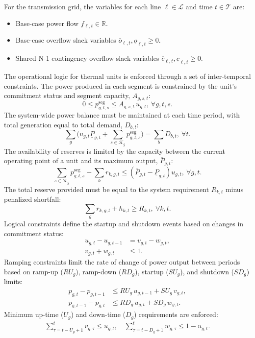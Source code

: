 \documentclass{ieeeaccess}
\begin{document}
For the transmission grid, the variables for each line $\ell\in\mathcal{L}$ and time $t\in\mathcal{T}$ are:
\begin{itemize}
    \item Base-case power flow $f_{\ell,t}\in\mathbb{R}$.
    \item Base-case overflow slack variables $\overline{o}_{\ell,t},\underline{o}_{\ell,t}\ge 0$.
    \item Shared N-1 contingency overflow slack variables $\overline{c}_{\ell,t},\underline{c}_{\ell,t}\ge 0$.
\end{itemize}

The operational logic for thermal units is enforced through a set of inter-temporal constraints. The power produced in each segment is constrained by the unit's commitment status and segment capacity, $A_{g,s,t}$:
\begin{equation}
0\le p^{\mathrm{seg}}_{g,t,s} \le A_{g,s,t}\,u_{g,t}, \ \forall g,t,s. \label{eq:seg-link}
\end{equation}
The system-wide power balance must be maintained at each time period, with total generation equal to total demand, $D_{b,t}$:
\begin{equation}
\sum_{g}\Big(u_{g,t}\underline{P}_{g,t}+\sum_{s\in \mathcal{K}_g}p^{\mathrm{seg}}_{g,t,s}\Big)=\sum_{b}D_{b,t}, \ \forall t. \label{eq:balance}
\end{equation}
The availability of reserves is limited by the capacity between the current operating point of a unit and its maximum output, $\overline{P}_{g,t}$:
\begin{equation}
\sum_{s\in \mathcal{K}_g}p^{\mathrm{seg}}_{g,t,s}+\sum_{k}r_{k,g,t}\le (\overline{P}_{g,t}-\underline{P}_{g,t})u_{g,t}, \ \forall g,t. \label{eq:res-head}
\end{equation}
The total reserve provided must be equal to the system requirement $R_{k,t}$ minus penalized shortfall:
\begin{equation}
\sum_{g}r_{k,g,t} + h_{k,t} \ge R_{k,t}, \ \forall k,t. \label{eq:res-req}
\end{equation}
Logical constraints define the startup and shutdown events based on changes in commitment status:
\begin{align}
u_{g,t}-u_{g,t-1} &= v_{g,t}-w_{g,t}, \label{eq:su-def}\\
v_{g,t}+w_{g,t} &\le 1. \label{eq:su-excl}
\end{align}
Ramping constraints limit the rate of change of power output between periods based on ramp-up ($RU_g$), ramp-down ($RD_g$), startup ($SU_g$), and shutdown ($SD_g$) limits:
\begin{align}
p_{g,t}-p_{g,t-1} &\le RU_g\,u_{g,t-1} + SU_g\,v_{g,t}, \label{eq:ramp-up}\\
p_{g,t-1}-p_{g,t} &\le RD_g\,u_{g,t} + SD_g\,w_{g,t}. \label{eq:ramp-dn}
\end{align}
Minimum up-time ($U_g$) and down-time ($D_g$) requirements are enforced:
\begin{align}
\sum_{\tau=t-U_g+1}^{t} v_{g,\tau} \le u_{g,t}, \quad
\sum_{\tau=t-D_g+1}^{t} w_{g,\tau} \le 1-u_{g,t}. \label{eq:min-ud}
\end{align}
\end{document}
